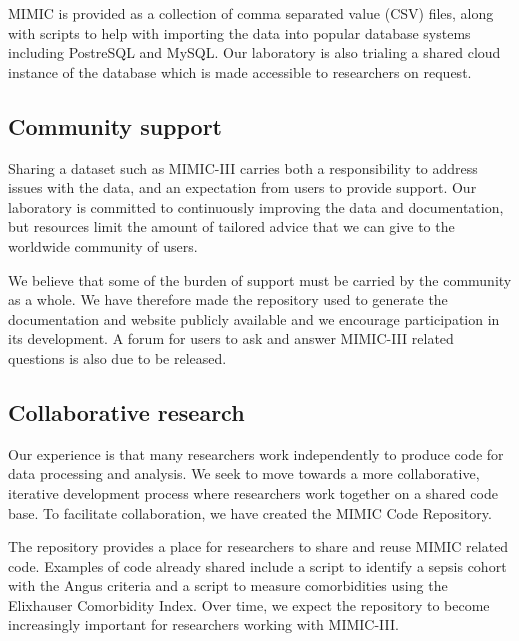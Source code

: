 \documentclass[english]{article}
\begin{document}

MIMIC is provided as a collection of comma separated value (CSV) files, along with scripts to help with importing the data into popular database systems including PostreSQL and MySQL. Our laboratory is also trialing a shared cloud instance of the database which is made accessible to researchers on request. 

\subsection*{Community support}

Sharing a dataset such as MIMIC-III carries both a responsibility to address issues with the data, and an expectation from users to provide support. Our laboratory is committed to continuously improving the data and documentation, but resources limit the amount of tailored advice that we can give to the worldwide community of users.

We believe that some of the burden of support must be carried by the community as a whole. We have therefore made the repository used to generate the documentation and website publicly available and we encourage participation in its development. A forum for users to ask and answer MIMIC-III related questions is also due to be released.


\subsection*{Collaborative research}

Our experience is that many researchers work independently to produce code for data processing and analysis. We seek to move towards a more collaborative, iterative development process where researchers work together on a shared code base. To facilitate collaboration, we have created the MIMIC Code Repository.

The repository provides a place for researchers to share and reuse MIMIC related code. Examples of code already shared include a script to identify a sepsis cohort with the Angus criteria and a script to measure comorbidities using the Elixhauser Comorbidity Index. Over time, we expect the repository to become increasingly important for researchers working with MIMIC-III.
\end{document}
